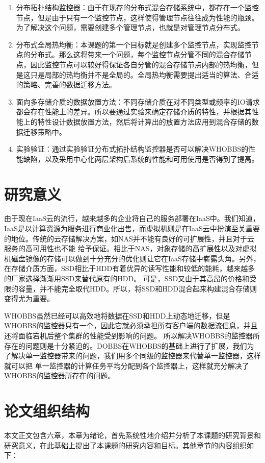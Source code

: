 \begin{enumerate}[noitemsep,topsep=0pt,parsep=0pt,partopsep=0pt]
	\item 分布拓扑结构监控器：由于在现存的分布式混合存储系统中，都存在一个监控节点，但是由于只有一个监控节点，这样使得管理节点往往成为性能的瓶颈。为了解决这个问题，需要创建多个管理节点，也就是对管理节点分布式。
	\item 分布式全局热均衡：本课题的第一个目标就是创建多个监控节点，实现监控节点的分布式。那么这将带来一个问题，每个监控节点分管不同的混合存储节点，因此监控节点可以较好得保证各自分管的混合存储节点内部的热均衡，但是这只是局部的热均衡并不是全局的。全局热均衡需要提出适当的算法、合适的策略、完善的数据迁移方法。	
	\item 面向多存储介质的数据放置方法：不同存储介质在对不同类型或频率的IO请求都会存在性能上的差异。所以要通过实验来确定存储介质的特性，并根据其性能上的特性设计数据放置方法，然后将计算出的放置方法应用到混合存储的数据迁移策略中。
	\item 实验验证：通过实验验证分布式拓扑结构监控器是否可以解决WHOBBS的性能缺陷，以及采用中心化两层架构后系统的性能和可用使用是否得到了提高。
\end{enumerate}

\section{研究意义}
由于现在IaaS云的流行，越来越多的企业将自己的服务部署在IaaS中。我们知道，IaaS是以计算资源为服务进行商业化出售，而虚拟机则是在IaaS云中扮演至关重要的地位。传统的云存储解决方案，如NAS并不能有良好的可扩展性，并且对于云服务的高可用性也不能
给予保证。相比于NAS，对象存储的高扩展性以及对虚拟机磁盘镜像的存储可以做到十分充分的优化则让它在IaaS存储中崭露头角。另外，在存储介质方面，SSD相比于HDD有着优异的读写性能和较低的能耗，越来越多的厂家选择渐渐用SSD来替代原有的HDD。
可是，SSD又由于其高昂的价格和受限的容量，并不能完全取代HDD。所以，将SSD和HDD混合起来构建混合存储则变得尤为重要。

WHOBBS虽然已经可以高效地将数据在SSD和HDD上动态地迁移，但是WHOBBS的监控器只有一个，因此它就必须承担所有客户端的数据流信息，并且还将面临宕机后整个集群的性能受到影响的问题。
所以解决WHOBBS的监控器所存在的问题则是十分紧迫的。DOBBS在WHOBBS的基础上进行了扩展，我们为了解决单一监控器带来的问题，我们用多个同级的监控器来代替单一监控器，这样就可以把
单一监控器的计算任务平均分配到各个监控器上，这样就充分解决了WHOBBS的监控器所存在的问题。

\section{论文组织结构}
本文正文包含六章，本章为绪论，首先系统性地介绍并分析了本课题的研究背景和研究意义，在此基础上提出了本课题的研究内容和目标。其他章节的内容组织如下：

